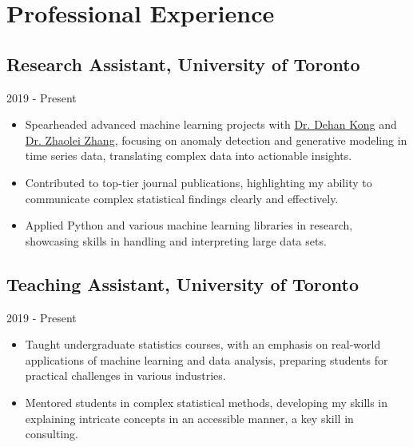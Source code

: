 \section{Professional Experience}
\subsection{Research Assistant, University of Toronto}{2019 - Present}
\begin{itemize}[leftmargin=*]
    \item Spearheaded advanced machine learning projects with \href{https://www.statistics.utoronto.ca/people/directories/all-faculty/dehan-kong}{Dr. Dehan Kong} and \href{http://sites.utoronto.ca/zhanglab/}{Dr. Zhaolei Zhang}, focusing on anomaly detection and generative modeling in time series data, translating complex data into actionable insights.
    \item Contributed to top-tier journal publications, highlighting my ability to communicate complex statistical findings clearly and effectively.
    \item Applied Python and various machine learning libraries in research, showcasing skills in handling and interpreting large data sets.
\end{itemize}

\subsection{Teaching Assistant, University of Toronto}{2019 - Present}
\begin{itemize}[leftmargin=*]
    \item Taught undergraduate statistics courses, with an emphasis on real-world applications of machine learning and data analysis, preparing students for practical challenges in various industries.
    \item Mentored students in complex statistical methods, developing my skills in explaining intricate concepts in an accessible manner, a key skill in consulting.
\end{itemize}

